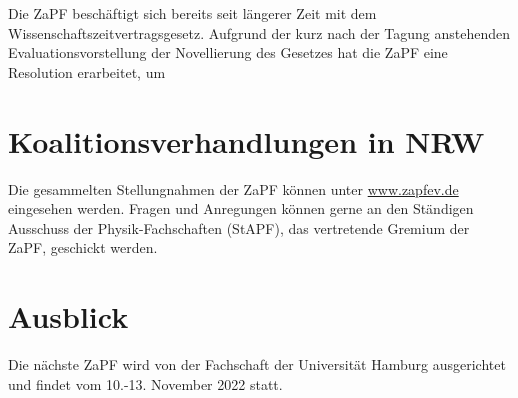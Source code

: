 \documentclass{scrartcl}
\begin{document}
Die ZaPF beschäftigt sich bereits seit längerer Zeit mit dem Wissenschaftszeitvertragsgesetz. Aufgrund der kurz nach der Tagung anstehenden Evaluationsvorstellung der Novellierung des Gesetzes hat die ZaPF eine Resolution erarbeitet, um 

\section*{Koalitionsverhandlungen in NRW}

Die gesammelten Stellungnahmen der ZaPF können unter \url{www.zapfev.de} eingesehen werden. Fragen und Anregungen können gerne an den Ständigen Ausschuss der Physik-Fachschaften (StAPF), das vertretende Gremium der ZaPF, geschickt werden.

\section*{Ausblick}
Die nächste ZaPF wird von der Fachschaft der Universität Hamburg ausgerichtet und findet vom 10.-13. November 2022 statt.
\end{document}
